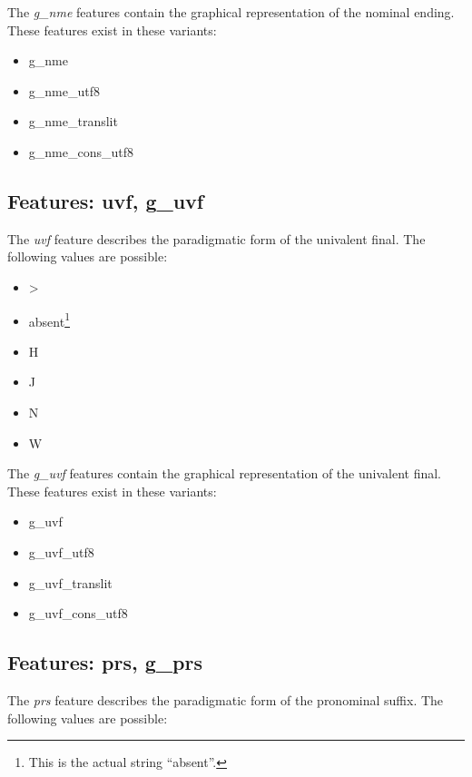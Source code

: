 \documentclass[11pt,oneside,a4paper]{memoir}
\begin{document}
The \emph{g\_nme} features contain the graphical representation of the nominal ending.
These features exist in these variants:

\begin{itemize}
\item g\_nme
\item g\_nme\_utf8
\item g\_nme\_translit
\item g\_nme\_cons\_utf8
\end{itemize}

\subsection{Features: uvf, g\_uvf}

The \emph{uvf} feature describes the paradigmatic form of the univalent final. The following
values are possible:

\begin{itemize}
\item >
\item absent\footnote{This is the actual string ``absent''.}
\item H
\item J
\item N
\item W
\end{itemize}

The \emph{g\_uvf} features contain the graphical representation of the univalent final.
These features exist in these variants:

\begin{itemize}
\item g\_uvf
\item g\_uvf\_utf8
\item g\_uvf\_translit
\item g\_uvf\_cons\_utf8
\end{itemize}


\subsection{Features: prs, g\_prs}\label{prs}

The \emph{prs} feature describes the paradigmatic form of the pronominal suffix. The following
values are possible:

\tabulinesep=0mm %
\end{document}
